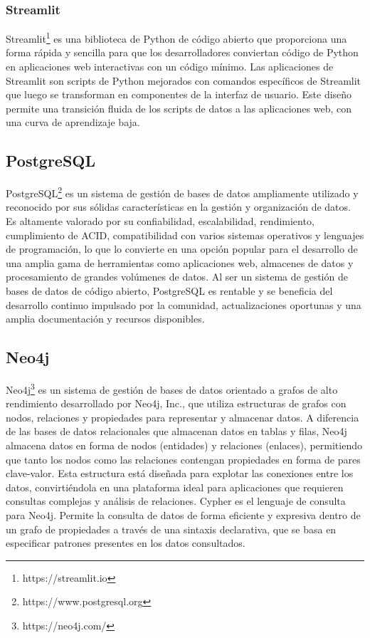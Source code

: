 \subsubsection{Streamlit}

Streamlit\footnote{https://streamlit.io} es una biblioteca de Python de código abierto que proporciona una forma rápida y sencilla para que los 
desarrolladores conviertan c\'odigo de Python en aplicaciones web 
interactivas con un código mínimo. 
Las aplicaciones de Streamlit son scripts de Python mejorados con comandos específicos de Streamlit que luego se 
transforman en componentes de la interfaz de usuario. Este diseño 
permite una transición fluida de los scripts de datos a las aplicaciones web, con una curva de aprendizaje baja.


\subsection{PostgreSQL}

PostgreSQL\footnote{https://www.postgresql.org} es un sistema de gestión de bases de datos ampliamente utilizado y 
reconocido por sus sólidas 
características en la gestión y organización de datos. Es altamente valorado por su confiabilidad, escalabilidad, 
rendimiento, cumplimiento de ACID, compatibilidad con varios sistemas operativos y lenguajes de programación, lo que 
lo convierte en una opción popular para el desarrollo de una amplia gama de herramientas 
como aplicaciones web, 
almacenes de datos y procesamiento de grandes volúmenes de datos. 
Al ser un sistema de gestión de bases de datos de código abierto, PostgreSQL es rentable y se beneficia del 
desarrollo continuo impulsado por la comunidad, actualizaciones oportunas y una amplia documentación y recursos 
disponibles.

\subsection{Neo4j}

Neo4j\footnote{https://neo4j.com/} es un sistema de gestión de bases de datos orientado a grafos de alto rendimiento desarrollado por 
Neo4j, Inc., 
que utiliza estructuras de grafos con nodos, relaciones y propiedades para representar y almacenar datos. A 
diferencia de las bases de datos relacionales que almacenan datos en tablas y filas, Neo4j almacena datos en 
forma de nodos (entidades) y relaciones (enlaces), permitiendo que tanto los nodos como las relaciones contengan 
propiedades en forma de pares clave-valor. Esta estructura está diseñada para explotar las conexiones entre 
los datos, convirtiéndola en una plataforma ideal para aplicaciones que requieren consultas complejas y 
análisis de relaciones. Cypher es el lenguaje de consulta para Neo4j. Permite la consulta de datos de forma eficiente 
y expresiva dentro de un grafo de propiedades a través de 
una sintaxis declarativa, que se basa en especificar patrones presentes en los datos consultados. 

